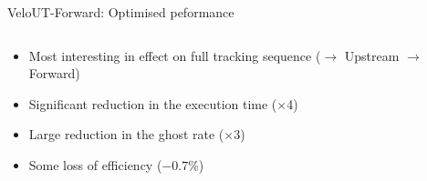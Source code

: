\documentclass[aspectratio=1610]{beamer}
\begin{document}
\begin{frame}{VeloUT-Forward: Optimised peformance}

\begin{columns}
\begin{column}{0.65\textwidth}

\begin{itemize}
  \item Most interesting in effect on full tracking sequence (\velo $\to$ Upstream $\to$ Forward)
\end{itemize}

\begin{itemize}
  \item Significant reduction in the execution time ($\times$4)
  \item Large reduction in the ghost rate ($\times$3)
  \item Some loss of efficiency ($-0.7$\%)
\end{itemize}

\bigskip

\begin{mdframed}[linecolor=barcolor]
\begin{center}
\end{center}
\end{mdframed}
\end{column}


\end{columns}
\end{frame}
\end{document}
